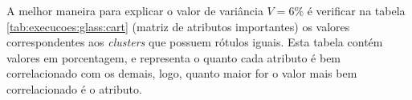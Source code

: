 
A melhor maneira para explicar o valor de variância  ${V=6\%}$ é verificar na tabela \ref{tab:execucoes:glass:cart} (matriz de atributos importantes) os valores correspondentes aos \textit{clusters} que possuem rótulos iguais. Esta tabela contém valores em porcentagem, e representa o quanto cada atributo é bem correlacionado com os demais, logo, quanto maior for o valor mais bem correlacionado é o atributo. 


\begin{table}[!h]
\centering
\caption{Matriz de Atributos Importantes do algoritmo CART na base Glass}
\label{tab:execucoes:glass:cart}
\end{table}    

